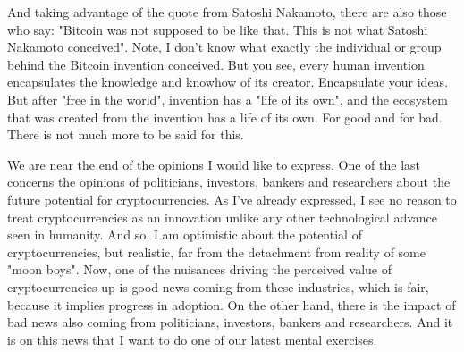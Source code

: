 \begin{foreignabstract}

  And taking advantage of the quote from Satoshi Nakamoto, there are also those who say: "Bitcoin was not supposed to be like that. This is not what Satoshi Nakamoto conceived". Note, I don't know what exactly the individual or group behind the Bitcoin invention conceived. But you see, every human invention encapsulates the knowledge and knowhow of its creator. Encapsulate your ideas. But after "free in the world", invention has a "life of its own", and the ecosystem that was created from the invention has a life of its own. For good and for bad. There is not much more to be said for this.

  We are near the end of the opinions I would like to express. One of the last concerns the opinions of politicians, investors, bankers and researchers about the future potential for cryptocurrencies. As I've already expressed, I see no reason to treat cryptocurrencies as an innovation unlike any other technological advance seen in humanity. And so, I am optimistic about the potential of cryptocurrencies, but realistic, far from the detachment from reality of some "moon boys". Now, one of the nuisances driving the perceived value of cryptocurrencies up is good news coming from these industries, which is fair, because it implies progress in adoption. On the other hand, there is the impact of bad news also coming from politicians, investors, bankers and researchers. And it is on this news that I want to do one of our latest mental exercises.

\end{foreignabstract}
